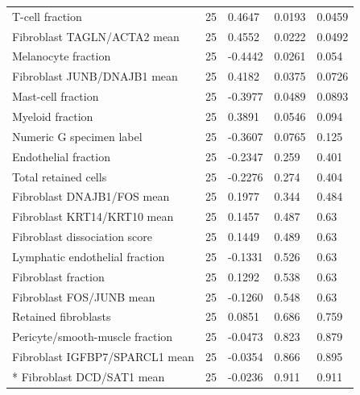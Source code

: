 {\begin{longtable}{@{}p{76mm}p{20mm}p{25mm}p{22mm}p{22mm}@{}}
T-cell fraction & 25 & 0.4647 & 0.0193 & 0.0459 \\
Fibroblast TAGLN/ACTA2 mean & 25 & 0.4552 & 0.0222 & 0.0492 \\
Melanocyte fraction & 25 & -0.4442 & 0.0261 & 0.054 \\
Fibroblast JUNB/DNAJB1 mean & 25 & 0.4182 & 0.0375 & 0.0726 \\
Mast-cell fraction & 25 & -0.3977 & 0.0489 & 0.0893 \\
Myeloid fraction & 25 & 0.3891 & 0.0546 & 0.094 \\
Numeric G specimen label & 25 & -0.3607 & 0.0765 & 0.125 \\
Endothelial fraction & 25 & -0.2347 & 0.259 & 0.401 \\
Total retained cells & 25 & -0.2276 & 0.274 & 0.404 \\
Fibroblast DNAJB1/FOS mean & 25 & 0.1977 & 0.344 & 0.484 \\
Fibroblast KRT14/KRT10 mean & 25 & 0.1457 & 0.487 & 0.63 \\
Fibroblast dissociation score & 25 & 0.1449 & 0.489 & 0.63 \\
Lymphatic endothelial fraction & 25 & -0.1331 & 0.526 & 0.63 \\
Fibroblast fraction & 25 & 0.1292 & 0.538 & 0.63 \\
Fibroblast FOS/JUNB mean & 25 & -0.1260 & 0.548 & 0.63 \\
Retained fibroblasts & 25 & 0.0851 & 0.686 & 0.759 \\
Pericyte/smooth-muscle fraction & 25 & -0.0473 & 0.823 & 0.879 \\
Fibroblast IGFBP7/SPARCL1 mean & 25 & -0.0354 & 0.866 & 0.895 \\*
Fibroblast DCD/SAT1 mean & 25 & -0.0236 & 0.911 & 0.911 \\
\end{longtable}
}


